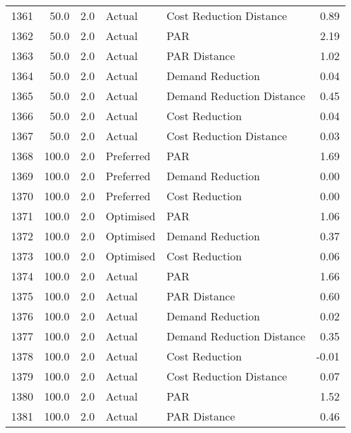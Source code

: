 \begin{longtable}{lrrllr}
1361 &         50.0 &     2.0 &         Actual &    Cost Reduction Distance &   0.89 \\
1362 &         50.0 &     2.0 &         Actual &                        PAR &   2.19 \\
1363 &         50.0 &     2.0 &         Actual &               PAR Distance &   1.02 \\
1364 &         50.0 &     2.0 &         Actual &           Demand Reduction &   0.04 \\
1365 &         50.0 &     2.0 &         Actual &  Demand Reduction Distance &   0.45 \\
1366 &         50.0 &     2.0 &         Actual &             Cost Reduction &   0.04 \\
1367 &         50.0 &     2.0 &         Actual &    Cost Reduction Distance &   0.03 \\
1368 &        100.0 &     2.0 &      Preferred &                        PAR &   1.69 \\
1369 &        100.0 &     2.0 &      Preferred &           Demand Reduction &   0.00 \\
1370 &        100.0 &     2.0 &      Preferred &             Cost Reduction &   0.00 \\
1371 &        100.0 &     2.0 &      Optimised &                        PAR &   1.06 \\
1372 &        100.0 &     2.0 &      Optimised &           Demand Reduction &   0.37 \\
1373 &        100.0 &     2.0 &      Optimised &             Cost Reduction &   0.06 \\
1374 &        100.0 &     2.0 &         Actual &                        PAR &   1.66 \\
1375 &        100.0 &     2.0 &         Actual &               PAR Distance &   0.60 \\
1376 &        100.0 &     2.0 &         Actual &           Demand Reduction &   0.02 \\
1377 &        100.0 &     2.0 &         Actual &  Demand Reduction Distance &   0.35 \\
1378 &        100.0 &     2.0 &         Actual &             Cost Reduction &  -0.01 \\
1379 &        100.0 &     2.0 &         Actual &    Cost Reduction Distance &   0.07 \\
1380 &        100.0 &     2.0 &         Actual &                        PAR &   1.52 \\
1381 &        100.0 &     2.0 &         Actual &               PAR Distance &   0.46 \\

\end{longtable}
